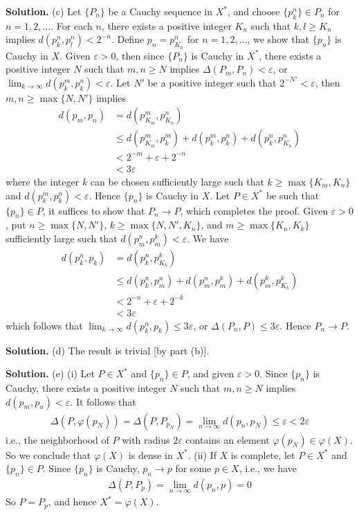 \documentclass[12pt]{article}
\theoremstyle{definition}
\begin{document}
\smallskip
\noindent\textbf{Solution.}\quad
(c) Let $\{P_n\}$ be a Cauchy sequence in $X^\ast$, and choose $\{p_k^n\}\in P_n$ for $n=1,2,\ldots$. For each $n$, there exists a positive integer $K_n$ such that $k,l\ge K_n$ implies $d(p_k^n,p_l^n)<2^{-n}$. Define $p_n=p_{K_n}^n$ for $n=1,2,\ldots$, we show that $\{p_n\}$ is Cauchy in $X$. Given $\varepsilon>0$, then since $\{P_n\}$ is Cauchy in $X^\ast$, there exists a positive integer $N$ such that $m,n\ge N$ implies $\Delta(P_m,P_n)<\varepsilon$, or $\lim_{k\to\infty}d(p_k^m,p_k^n)<\varepsilon$. Let $N'$ be a positive integer such that $2^{-N'}<\varepsilon$, then $m,n\ge\max\{N,N'\}$ implies
\begin{align*}
d(p_m,p_n)
&=d(p_{K_m}^m,p_{K_n}^n) \\
&\le d(p_{K_m}^m,p_k^m)+d(p_k^m,p_k^n)+d(p_k^n,p_{K_n}^n) \\
&<2^{-m}+\varepsilon+2^{-n} \\
&<3\varepsilon
\end{align*}
where the integer $k$ can be chosen sufficiently large such that $k\ge\max\{K_m,K_n\}$ and $d(p_k^m,p_k^n)<\varepsilon$. Hence $\{p_n\}$ is Cauchy in $X$. Let $P\in X^\ast$ be such that $\{p_n\}\in P$, it suffices to show that $P_n\to P$, which completes the proof. Given $\varepsilon>0$, put $n\ge\max\{N,N'\}$, $k\ge\max\{N,N',K_n\}$, and $m\ge\max\{K_n,K_k\}$ sufficiently large such that $d(p_m^n,p_m^k)<\varepsilon$. We have
\begin{align*}
d(p_k^n,p_k)
&=d(p_k^n,p_{K_k}^k) \\
&\le d(p_k^n,p_m^n)+d(p_m^n,p_m^k)+d(p_m^k,p_{K_k}^k) \\
&<2^{-n}+\varepsilon+2^{-k} \\
&<3\varepsilon
\end{align*}
which follows that $\lim_{k\to\infty}d(p_k^n,p_k)\le 3\varepsilon$, or $\Delta(P_n,P)\le 3\varepsilon$. Hence $P_n\to P$.

\smallskip
\noindent\textbf{Solution.}\quad
(d) The result is trivial [by part (b)].

\smallskip
\noindent\textbf{Solution.}\quad
(e) (i) Let $P\in X^\ast$ and $\{p_n\}\in P$, and given $\varepsilon>0$. Since $\{p_n\}$ is Cauchy, there exists a positive integer $N$ such that $m,n\ge N$ implies $d(p_m,p_n)<\varepsilon$. It follows that
\begin{align*}
\Delta(P,\varphi(p_N))
=\Delta(P,P_{p_N})
=\lim_{n\to\infty}d(p_n,p_N)
\le\varepsilon
<2\varepsilon
\end{align*}
i.e., the neighborhood of $P$ with radius $2\varepsilon$ contains an element $\varphi(p_N)\in\varphi(X)$. So we conclude that $\varphi(X)$ is dense in $X^\ast$.
(ii) If $X$ is complete, let $P\in X^\ast$ and $\{p_n\}\in P$. Since $\{p_n\}$ is Cauchy, $p_n\to p$ for some $p\in X$, i.e., we have
\begin{align*}
\Delta(P,P_p)
=\lim_{n\to\infty}d(p_n,p)
=0
\end{align*}
So $P=P_p$, and hence $X^\ast=\varphi(X)$.
\end{document}
